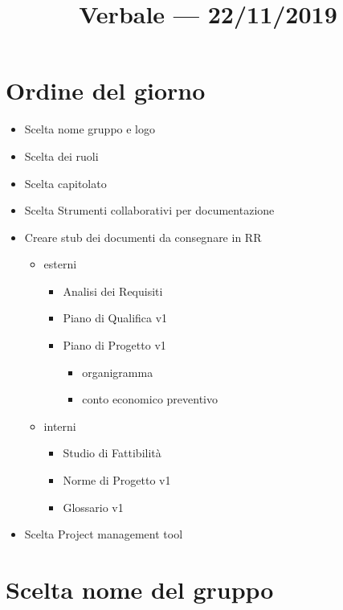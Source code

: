 \documentclass{article}
\title{Verbale --- 22/11/2019}
\begin{document}


\section{Ordine del giorno}%
\label{sec:ordine_del_giorno}

\begin{itemize}
  \item Scelta nome gruppo e logo
  \item Scelta dei ruoli
  \item Scelta capitolato
  \item Scelta Strumenti collaborativi per documentazione
  \item Creare stub dei documenti da consegnare in RR
        \begin{itemize}
          \item esterni
                \begin{itemize}
                  \item Analisi dei Requisiti
                  \item Piano di Qualifica v1
                  \item Piano di Progetto v1
                        \begin{itemize}
                          \item organigramma
                          \item conto economico preventivo
                        \end{itemize}
                \end{itemize}
          \item interni
                \begin{itemize}
                  \item Studio di Fattibilità
                  \item Norme di Progetto v1
                  \item Glossario v1
                \end{itemize}
        \end{itemize}
  \item Scelta Project management tool
\end{itemize}

\section{Scelta nome del gruppo}%
\label{sec:scelta_nome_del_gruppo}
\end{document}
